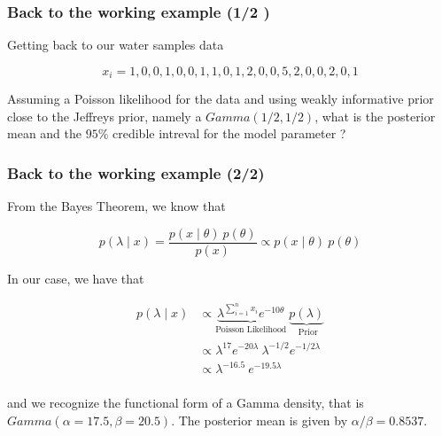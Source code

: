 \documentclass[border=5mm, convert, usenames, dvipsnames,beamer]{standalone}
\begin{document}
\begin{frame}[ fragile]{}
\frametitle{Back to the working example (1/2
)}

\vspace{30}
\noindent
Getting back to our water samples data

$$
x_{i} = 1, 0, 0, 1, 0, 0, 1, 1, 0, 1, 2, 0, 0, 5, 2, 0, 0, 2, 0, 1
$$

\vspace{10}
\noindent
Assuming a Poisson likelihood for the data and using weakly informative prior close to the Jeffreys  prior, namely a $Gamma(1/2, 1/2)$, what is the posterior mean and the $95 \%$ credible intreval for the model parameter ?

\par
\end{frame}







\begin{frame}[ fragile]{}
\frametitle{Back to the working example (2/2)}

\vspace{40}
\noindent
From the Bayes Theorem, we know that 

$$
p( \lambda   \mid x  ) = \frac{p(x \mid \theta) \  p(\theta)}{ p(x) }  \propto  p( x   \mid \theta) \  p(\theta) 
$$

\vspace{5}
\noindent
In our case, we have that

$$
\begin{align*}
p( \lambda   \mid x  ) & \propto  \underbrace{ \lambda^{\sum_{i=1}^{n}x_{i}} e^{-10\theta}}_{\text{Poisson  Likelihood}} \    \underbrace{ p(\lambda)}_{\text{ Prior}} \\
& \propto   \lambda^{17} e^{-20\lambda} \  \lambda^{ -1/2 }   e^{- 1/2 \lambda  } \\
& \propto   \lambda^{-16.5} \    e^{-  19.5 \lambda  } \\
\end{align} 
$$

\vspace{5}
\noindent
and we recognize the functional form of a Gamma density, that is $Gamma(\alpha = 17.5, \beta = 20.5)$. The posterior mean is given by $\alpha / \beta = 0.8537$.


\par
\end{frame}
\end{document}
